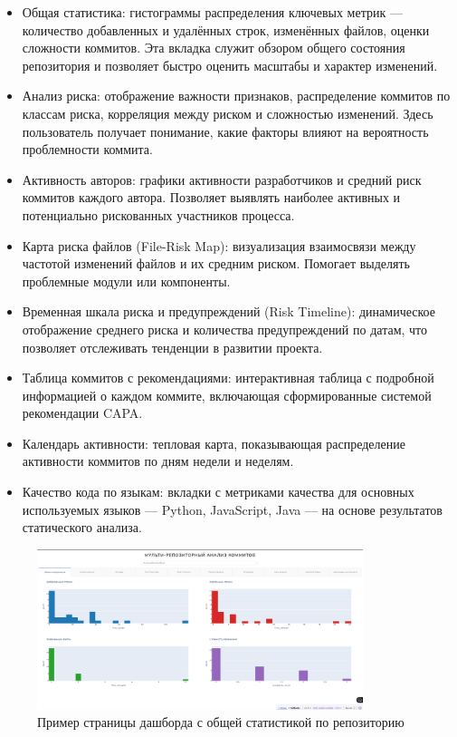 \begin{itemize}
	\item Общая статистика: гистограммы распределения ключевых метрик — количество добавленных и удалённых строк, изменённых файлов, оценки сложности коммитов. Эта вкладка служит обзором общего состояния репозитория и позволяет быстро оценить масштабы и характер изменений.
	\item Анализ риска: отображение важности признаков, распределение коммитов по классам риска, корреляция между риском и сложностью изменений. Здесь пользователь получает понимание, какие факторы влияют на вероятность проблемности коммита.
	\item Активность авторов: графики активности разработчиков и средний риск коммитов каждого автора. Позволяет выявлять наиболее активных и потенциально рискованных участников процесса.
	\item Карта риска файлов (File-Risk Map): визуализация взаимосвязи между частотой изменений файлов и их средним риском. Помогает выделять проблемные модули или компоненты.
	\item Временная шкала риска и предупреждений (Risk Timeline): динамическое отображение среднего риска и количества предупреждений по датам, что позволяет отслеживать тенденции в развитии проекта.
	\item Таблица коммитов с рекомендациями: интерактивная таблица с подробной информацией о каждом коммите, включающая сформированные системой рекомендации CAPA.
	\item Календарь активности: тепловая карта, показывающая распределение активности коммитов по дням недели и неделям.
	\item Качество кода по языкам: вкладки с метриками качества для основных используемых языков — Python, JavaScript, Java — на основе результатов статического анализа.
\end{itemize}

\begin{figure}[ht]
	\centering
	\includegraphics[width=0.85\textwidth]{my_folder/images/dashboard.png}
	\caption{Пример страницы дашборда с общей статистикой по репозиторию}
\end{figure}

